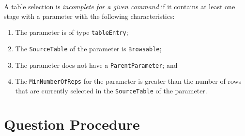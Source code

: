 \documentclass[11pt]{article}
\begin{document}
A table selection is {\it incomplete for a given command}
if it contains at least one stage with a parameter with the following
characteristics:
\begin{enumerate}
\item The parameter is of type {\tt tableEntry};
\item The {\tt SourceTable} of the parameter is {\tt Browsable};
\item The parameter does not have a {\tt ParentParameter}; and
\item The {\tt MinNumberOfReps} for the parameter is greater than the
  number of rows that are currently selected in the {\tt SourceTable} of the
  parameter.
\end{enumerate}

\section{Question Procedure}
\end{document}
